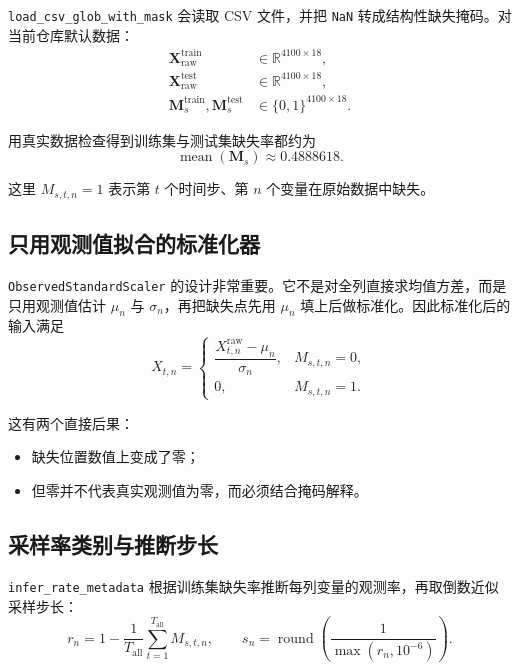 \documentclass[UTF8]{ctexart}
\begin{document}
\verb|load_csv_glob_with_mask| 会读取 CSV 文件，并把 \verb|NaN| 转成结构性缺失掩码。对当前仓库默认数据：
\begin{align}
    \bm{X}^{\text{train}}_{\text{raw}} &\in \mathbb{R}^{4100 \times 18}, \\
    \bm{X}^{\text{test}}_{\text{raw}} &\in \mathbb{R}^{4100 \times 18}, \\
    \bm{M}^{\text{train}}_{s}, \bm{M}^{\text{test}}_{s} &\in \{0,1\}^{4100 \times 18}.
\end{align}

用真实数据检查得到训练集与测试集缺失率都约为
\begin{equation}
    \operatorname{mean}(\bm{M}_s) \approx 0.4888618.
\end{equation}

这里 \(M_{s,t,n}=1\) 表示第 \(t\) 个时间步、第 \(n\) 个变量在原始数据中缺失。

\subsection{只用观测值拟合的标准化器}

\verb|ObservedStandardScaler| 的设计非常重要。它不是对全列直接求均值方差，而是只用观测值估计
\(\mu_n\) 与 \(\sigma_n\)，再把缺失点先用 \(\mu_n\) 填上后做标准化。因此标准化后的输入满足
\begin{equation}
    X_{t,n} =
    \begin{cases}
        \dfrac{X^{\text{raw}}_{t,n} - \mu_n}{\sigma_n}, & M_{s,t,n}=0, \\[6pt]
        0, & M_{s,t,n}=1.
    \end{cases}
\end{equation}

这有两个直接后果：
\begin{itemize}
    \item 缺失位置数值上变成了零；
    \item 但零并不代表真实观测值为零，而必须结合掩码解释。
\end{itemize}

\subsection{采样率类别与推断步长}

\verb|infer_rate_metadata| 根据训练集缺失率推断每列变量的观测率，再取倒数近似采样步长：
\begin{equation}
    r_n = 1 - \frac{1}{T_{\text{all}}}\sum_{t=1}^{T_{\text{all}}} M_{s,t,n},
    \qquad
    s_n = \operatorname{round}\!\left(\frac{1}{\max(r_n,10^{-6})}\right).
\end{equation}
\end{document}
